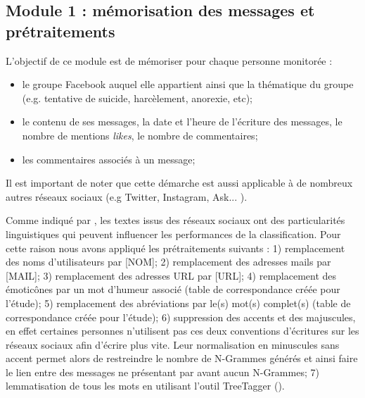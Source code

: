\subsection{Module 1 : mémorisation des messages et prétraitements}\label{module1}

L'objectif de ce module est de mémoriser pour chaque personne monitorée :
\begin{itemize}
\item le groupe Facebook auquel elle appartient ainsi que la thématique du groupe (e.g. tentative de suicide, harcèlement, anorexie, etc);
\item le contenu de ses messages,  la date et l'heure de l'écriture des messages, le nombre de mentions \emph{likes}, le nombre de commentaires;
\item les commentaires associés à un message;
\end{itemize}

Il est important de noter que cette démarche est aussi applicable à de nombreux autres réseaux sociaux (e.g Twitter, Instagram, Ask... ).

Comme indiqué par \cite{Balahur2013}, les textes issus des réseaux sociaux ont des particularités linguistiques qui peuvent influencer les performances de la classification. Pour cette raison nous avons appliqué les prétraitements suivants :
1) remplacement des noms d'utilisateurs par [NOM];
2) remplacement des adresses mails par [MAIL];
3) remplacement des adresses URL par [URL];
4) remplacement des émoticônes par un mot d'humeur associé (table de correspondance créée pour l'étude);
5) remplacement des abréviations par le(s) mot(s) complet(s) (table de correspondance créée pour l'étude);
6) suppression des accents et des majuscules, en effet certaines personnes n'utilisent pas ces deux conventions d'écritures sur les réseaux sociaux afin d'écrire plus vite. Leur normalisation en minuscules sans accent permet alors de restreindre le nombre de N-Grammes générés et ainsi faire le lien entre des messages ne présentant par avant aucun N-Grammes;
7) lemmatisation de tous les mots en utilisant l’outil TreeTagger (\cite{Schmid1994}).